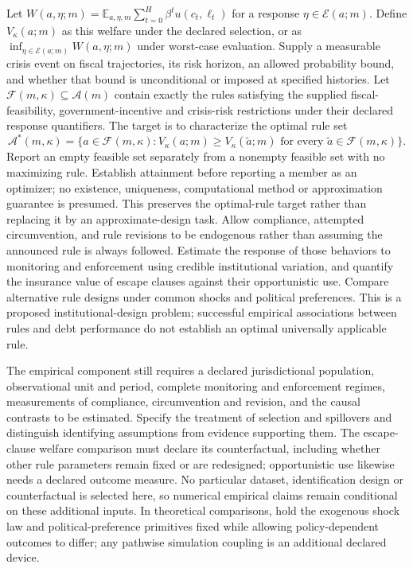 \documentclass[11pt,a4paper]{article}
\begin{document}
Let \(W(a,\eta;m)=\mathbb E_{a,\eta,m}\sum_{t=0}^{H}\beta^t u(c_t,\ell_t)\) for a response \(\eta\in\mathcal E(a;m)\). Define \(V_\kappa(a;m)\) as this welfare under the declared selection, or as \(\inf_{\eta\in\mathcal E(a;m)}W(a,\eta;m)\) under worst-case evaluation. Supply a measurable crisis event on fiscal trajectories, its risk horizon, an allowed probability bound, and whether that bound is unconditional or imposed at specified histories. Let \(\mathcal F(m,\kappa)\subseteq\mathcal A(m)\) contain exactly the rules satisfying the supplied fiscal-feasibility, government-incentive and crisis-risk restrictions under their declared response quantifiers. The target is to characterize the optimal rule set
\[
\mathcal A^*(m,\kappa)=\{a\in\mathcal F(m,\kappa):V_\kappa(a;m)\geq V_\kappa(\tilde a;m)\text{ for every }\tilde a\in\mathcal F(m,\kappa)\}.
\]
Report an empty feasible set separately from a nonempty feasible set with no maximizing rule. Establish attainment before reporting a member as an optimizer; no existence, uniqueness, computational method or approximation guarantee is presumed. This preserves the optimal-rule target rather than replacing it by an approximate-design task.
Allow compliance, attempted circumvention, and rule revisions to be endogenous rather than assuming the announced rule is always followed. Estimate the response of those behaviors to monitoring and enforcement using credible institutional variation, and quantify the insurance value of escape clauses against their opportunistic use. Compare alternative rule designs under common shocks and political preferences. This is a proposed institutional-design problem; successful empirical associations between rules and debt performance do not establish an optimal universally applicable rule.

The empirical component still requires a declared jurisdictional population, observational unit and period, complete monitoring and enforcement regimes, measurements of compliance, circumvention and revision, and the causal contrasts to be estimated. Specify the treatment of selection and spillovers and distinguish identifying assumptions from evidence supporting them. The escape-clause welfare comparison must declare its counterfactual, including whether other rule parameters remain fixed or are redesigned; opportunistic use likewise needs a declared outcome measure. No particular dataset, identification design or counterfactual is selected here, so numerical empirical claims remain conditional on these additional inputs. In theoretical comparisons, hold the exogenous shock law and political-preference primitives fixed while allowing policy-dependent outcomes to differ; any pathwise simulation coupling is an additional declared device.
\end{document}
